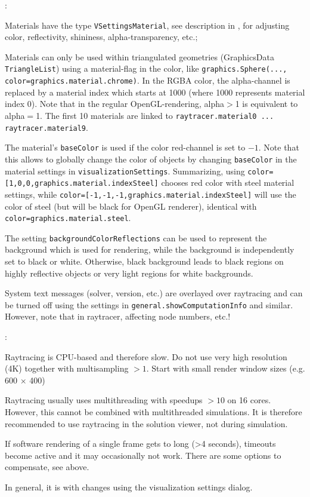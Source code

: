 \noindent {}:
\bi
  \item Materials have the type \texttt{VSettingsMaterial}, see description in , for adjusting color, reflectivity, shininess, alpha-transparency, etc.; 
  \item Materials can only be used within triangulated geometries (GraphicsData \texttt{TriangleList}) using a material-flag in the color, like \texttt{graphics.Sphere(..., color=graphics.material.chrome)}. In the RGBA color, the alpha-channel is replaced by a material index which starts at 1000 (where 1000 represents material index 0). Note that in the regular OpenGL-rendering, alpha$>$1 is equivalent to alpha$=$1. The first 10 materials are linked to \texttt{raytracer.material0 ... raytracer.material9}.
  \item The material's \texttt{baseColor} is used if the color red-channel is set to $-1$. Note that this allows to globally change the color of objects by changing \texttt{baseColor} in the material settings in \texttt{visualizationSettings}. Summarizing, using \texttt{color=[1,0,0,graphics.material.indexSteel]} chooses red color with steel material settings, while \texttt{color=[-1,-1,-1,graphics.material.indexSteel]} will use the color of steel (but will be black for OpenGL renderer), identical with \texttt{color=graphics.material.steel}.
  \item The setting \texttt{backgroundColorReflections} can be used to represent the background which is used for rendering, while the background is independently set to black or white. Otherwise, black background leads to black regions on highly reflective objects or very light regions for white backgrounds.
  \item System text messages (solver, version, etc.) are overlayed over raytracing and can be turned off using the settings in \texttt{general.showComputationInfo} and similar. However, note that  in raytracer, affecting node numbers, etc.!
\ei

\noindent {}:
\bi
  \item Raytracing is CPU-based and therefore slow. Do not use very high resolution (4K) together with multisampling $>1$. Start with small render window sizes (e.g. 600 $\times$ 400)
  \item Raytracing usually uses multithreading with speedups $>10$ on 16 cores. However, this cannot be combined with multithreaded simulations. It is therefore recommended to use raytracing in the solution viewer, not during simulation.
  \item If software rendering of a single frame gets to long (>4 seconds), timeouts become active and it may occasionally not work. There are some options to compensate, see above.
  \item In general, it is  with changes using the visualization settings dialog.
\ei

